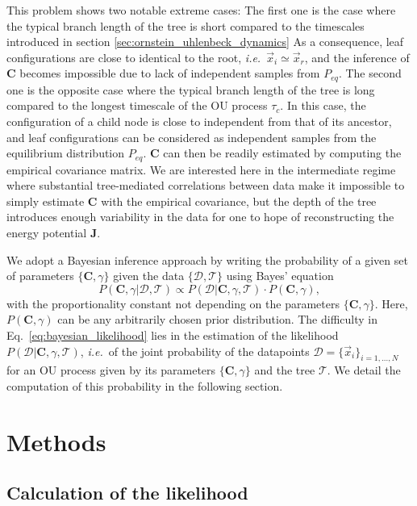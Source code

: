 \documentclass[preprint,amsmath,amssymb,superscriptaddress,showpacs,pre]{revtex4-1}
\newcommand{\ie}{\emph{i.e.}}
\def\vx{\vec x}
\begin{document}
This problem shows two notable extreme cases: 
The first one is the case where the typical branch length of the tree is short compared to the timescales introduced in section \ref{sec:ornstein_uhlenbeck_dynamics}
As a consequence, leaf configurations are close to identical to the root, \ie~$\vx_i\simeq\vx_r$, and the inference of $\bm C$ becomes impossible due to lack of independent samples from $P_{eq}$. 
The second one is the opposite case where the typical branch length of the tree is long compared to the longest timescale of the OU process $\tau_c$.
In this case, the configuration of a child node is close to independent from that of its ancestor, and leaf configurations can be considered as independent samples from the equilibrium distribution $P_{eq}$.
$\bm C$ can then be readily estimated by computing the empirical covariance matrix. 
We are interested here in the intermediate regime where substantial tree-mediated correlations between data
make it impossible to simply estimate $\bm C$ with the empirical covariance, but the depth of the tree introduces enough variability in the data for one to hope of reconstructing the energy potential $\bm{J}$.

We adopt a Bayesian inference approach by writing the probability of a given set of parameters $\{\bm C, \gamma\}$ given the data $\{\mathcal{D},\mathcal{T}\}$ using Bayes' equation
\begin{equation}
	P(\bm C, \gamma\vert\mathcal{D},\mathcal{T}) \propto P(\mathcal{D}\vert\bm C, \gamma,\mathcal{T})\cdot P(\bm C, \gamma),
	\label{eq:bayesian_likelihood}
\end{equation}
with the proportionality constant not depending on the parameters $\{\bm C, \gamma\}$. Here, $P(\bm C, \gamma)$ can be any arbitrarily chosen prior distribution. The difficulty in Eq.~\eqref{eq:bayesian_likelihood} lies in the estimation of the likelihood $P(\mathcal{D}\vert\bm C, \gamma, \mathcal{T})$,
\ie~of the joint probability of the datapoints $\mathcal{D}=\{\vx_i\}_{i=1,...,N}$ for an OU process given by its parameters $\{\bm C, \gamma\}$ and the tree $\mathcal{T}$.  We detail the computation of this probability in the following section. 


\section{Methods}
\label{sec:methods}

\subsection{Calculation of the likelihood} %
\label{sub:Calculation_of_the_likelihood}
 
\end{document}
